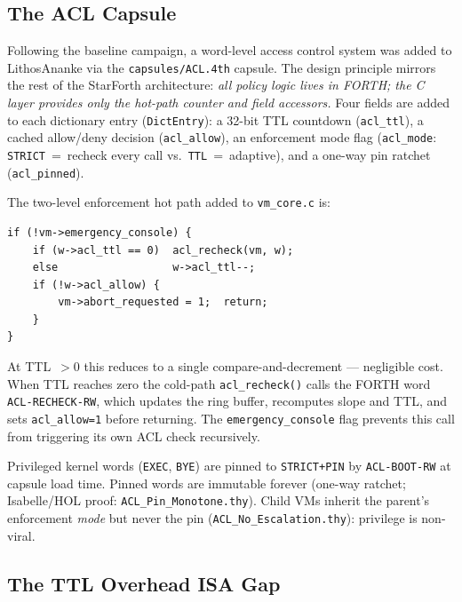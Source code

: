 \documentclass[10pt,a4paper]{article}
\begin{document}
\subsection{The ACL Capsule}
\label{sec:acl_capsule}

Following the baseline campaign, a word-level access control system was added
to LithosAnanke via the \texttt{capsules/ACL.4th} capsule.  The design
principle mirrors the rest of the StarForth architecture: \emph{all policy logic
lives in FORTH; the C layer provides only the hot-path counter and field
accessors.}  Four fields are added to each dictionary entry
(\texttt{DictEntry}): a 32-bit TTL countdown (\texttt{acl\_ttl}), a cached
allow/deny decision (\texttt{acl\_allow}), an enforcement mode flag
(\texttt{acl\_mode}: \texttt{STRICT}~=~recheck every call vs.\
\texttt{TTL}~=~adaptive), and a one-way pin ratchet (\texttt{acl\_pinned}).

The two-level enforcement hot path added to \texttt{vm\_core.c} is:

\begin{lstlisting}[basicstyle=\ttfamily\footnotesize,frame=single,
                   backgroundcolor=\color{gray!8},xleftmargin=6pt]
if (!vm->emergency_console) {
    if (w->acl_ttl == 0)  acl_recheck(vm, w);
    else                  w->acl_ttl--;
    if (!w->acl_allow) {
        vm->abort_requested = 1;  return;
    }
}
\end{lstlisting}

At TTL~$> 0$ this reduces to a single compare-and-decrement --- negligible
cost.  When TTL reaches zero the cold-path \texttt{acl\_recheck()} calls the
FORTH word \texttt{ACL-RECHECK-RW}, which updates the ring buffer, recomputes
slope and TTL, and sets \texttt{acl\_allow=1} before returning.  The
\texttt{emergency\_console} flag prevents this call from triggering its own
ACL check recursively.

Privileged kernel words (\texttt{EXEC}, \texttt{BYE}) are pinned to
\texttt{STRICT+PIN} by \texttt{ACL-BOOT-RW} at capsule load time.  Pinned
words are immutable forever (one-way ratchet; Isabelle/HOL proof:
\texttt{ACL\_Pin\_Monotone.thy}).  Child VMs inherit the parent's
enforcement \emph{mode} but never the pin (\texttt{ACL\_No\_Escalation.thy}):
privilege is non-viral.

\subsection{The TTL Overhead ISA Gap}
\label{sec:acl_isagap}
\end{document}

